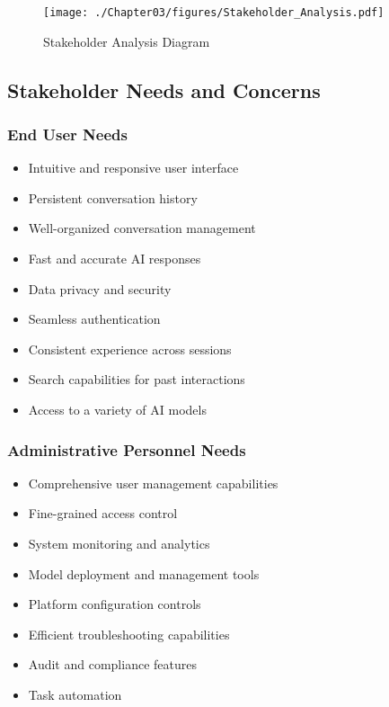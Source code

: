 \begin{sidewaysfigure}[p]
    \centering
    \texttt{[image: ./Chapter03/figures/Stakeholder\_Analysis.pdf]}
    \caption{Stakeholder Analysis Diagram}
    \label{fig:stakeholder-analysis}
\end{sidewaysfigure}
\clearpage

\subsection{Stakeholder Needs and Concerns}

\subsubsection*{End User Needs}
\begin{itemize}
   \item Intuitive and responsive user interface
   \item Persistent conversation history
   \item Well-organized conversation management
   \item Fast and accurate AI responses
   \item Data privacy and security
   \item Seamless authentication
   \item Consistent experience across sessions
   \item Search capabilities for past interactions
   \item Access to a variety of AI models
\end{itemize}

\subsubsection*{Administrative Personnel Needs}
\begin{itemize}
   \item Comprehensive user management capabilities
   \item Fine-grained access control
   \item System monitoring and analytics
   \item Model deployment and management tools
   \item Platform configuration controls
   \item Efficient troubleshooting capabilities
   \item Audit and compliance features
   \item Task automation
\end{itemize}

